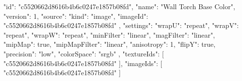 {
  "id": "c5520662d8616b4b6c0247e1857b08fd",
  "name": "Wall Torch Base Color",
  "version": 1,
  "source": {
    "kind": "image",
    "imageId": "c5520662d8616b4b6c0247e1857b08fd"
  },
  "settings": {
    "wrapU": "repeat",
    "wrapV": "repeat",
    "wrapW": "repeat",
    "minFilter": "linear",
    "magFilter": "linear",
    "mipMap": true,
    "mipMapFilter": "linear",
    "anisotropy": 1,
    "flipY": true,
    "precision": "low",
    "colorSpace": "srgb"
  },
  "textureIds": [
    "c5520662d8616b4b6c0247e1857b08fd"
  ],
  "imageIds": [
    "c5520662d8616b4b6c0247e1857b08fd"
  ]
}
